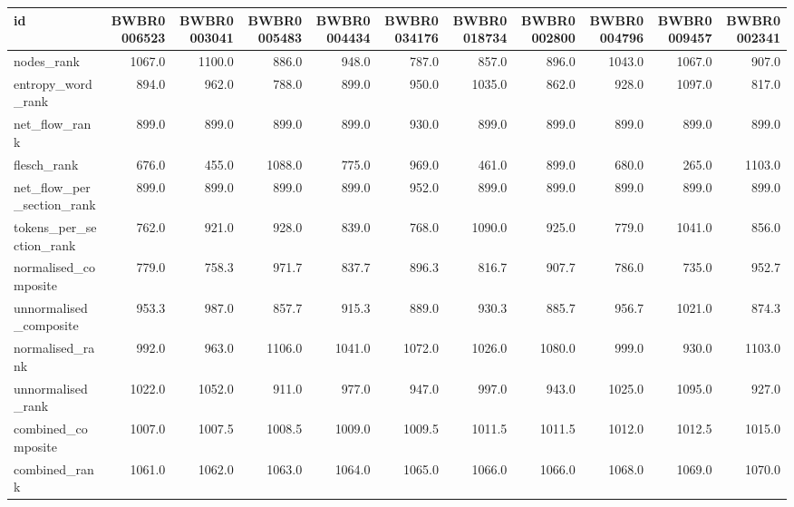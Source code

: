 \begin{tabular}{lrrrrrrrrrr}
\toprule
id & BWBR0006523 & BWBR0003041 & BWBR0005483 & BWBR0004434 & BWBR0034176 & BWBR0018734 & BWBR0002800 & BWBR0004796 & BWBR0009457 & BWBR0002341 \\
\midrule
nodes\_rank & 1067.0 & 1100.0 & 886.0 & 948.0 & 787.0 & 857.0 & 896.0 & 1043.0 & 1067.0 & 907.0 \\
\cline{1-11}
entropy\_word\_rank & 894.0 & 962.0 & 788.0 & 899.0 & 950.0 & 1035.0 & 862.0 & 928.0 & 1097.0 & 817.0 \\
\cline{1-11}
net\_flow\_rank & 899.0 & 899.0 & 899.0 & 899.0 & 930.0 & 899.0 & 899.0 & 899.0 & 899.0 & 899.0 \\
\cline{1-11}
flesch\_rank & 676.0 & 455.0 & 1088.0 & 775.0 & 969.0 & 461.0 & 899.0 & 680.0 & 265.0 & 1103.0 \\
\cline{1-11}
net\_flow\_per\_section\_rank & 899.0 & 899.0 & 899.0 & 899.0 & 952.0 & 899.0 & 899.0 & 899.0 & 899.0 & 899.0 \\
\cline{1-11}
tokens\_per\_section\_rank & 762.0 & 921.0 & 928.0 & 839.0 & 768.0 & 1090.0 & 925.0 & 779.0 & 1041.0 & 856.0 \\
\cline{1-11}
normalised\_composite & 779.0 & 758.3 & 971.7 & 837.7 & 896.3 & 816.7 & 907.7 & 786.0 & 735.0 & 952.7 \\
\cline{1-11}
unnormalised\_composite & 953.3 & 987.0 & 857.7 & 915.3 & 889.0 & 930.3 & 885.7 & 956.7 & 1021.0 & 874.3 \\
\cline{1-11}
normalised\_rank & 992.0 & 963.0 & 1106.0 & 1041.0 & 1072.0 & 1026.0 & 1080.0 & 999.0 & 930.0 & 1103.0 \\
\cline{1-11}
unnormalised\_rank & 1022.0 & 1052.0 & 911.0 & 977.0 & 947.0 & 997.0 & 943.0 & 1025.0 & 1095.0 & 927.0 \\
\cline{1-11}
combined\_composite & 1007.0 & 1007.5 & 1008.5 & 1009.0 & 1009.5 & 1011.5 & 1011.5 & 1012.0 & 1012.5 & 1015.0 \\
\cline{1-11}
combined\_rank & 1061.0 & 1062.0 & 1063.0 & 1064.0 & 1065.0 & 1066.0 & 1066.0 & 1068.0 & 1069.0 & 1070.0 \\
\cline{1-11}
\bottomrule
\end{tabular}
